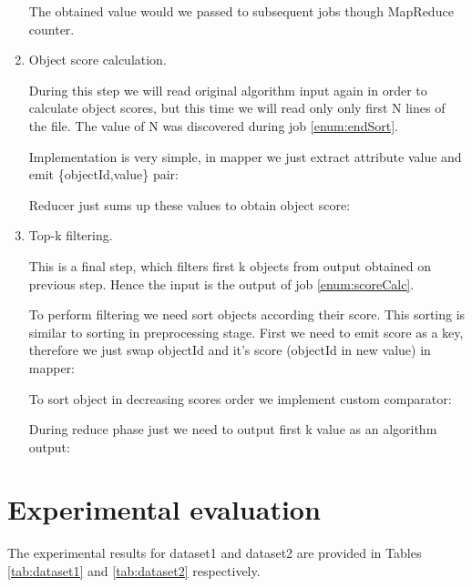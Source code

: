 \documentclass[a4paper]{article}
\begin{document}
\begin{enumerate}
    The obtained value would we passed to subsequent jobs though MapReduce counter.

    \item Object score calculation.
    \label{enum:scoreCalc}

    During this step we will read original algorithm input again in order to calculate object scores, but this time we will read only only first N lines of the file. 
    The value of N was discovered during job \ref{enum:endSort}.

    Implementation is very simple, in mapper we just extract attribute value and emit \{objectId,value\} pair:
    

    Reducer just sums up these values to obtain object score:
    

    \item Top-k filtering.

    This is a final step, which filters first k objects from output obtained on previous step.
    Hence the input is the output of job \ref{enum:scoreCalc}.

    To perform filtering we need sort objects according their score.
    This sorting is similar to sorting in preprocessing stage.
    First we need to emit score as a key, therefore we just swap objectId and it's score (objectId in new value) in mapper:
    

    To sort object in decreasing scores order we implement custom comparator:
    

    During reduce phase just we need to output first k value as an algorithm output:
    
\end{enumerate}

\section{Experimental evaluation}
\label{sec:experiments}

The experimental results for dataset1 and dataset2 are provided in Tables \ref{tab:dataset1} and \ref{tab:dataset2} respectively. 
\end{document}
